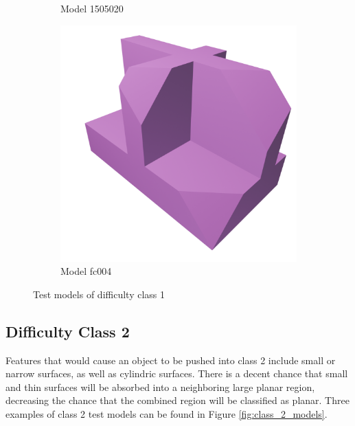 \begin{figure}[htb]
\begin{subfigure}{0.3\textwidth}
	\caption{Model 1505020}
\end{subfigure}
\hfill
\begin{subfigure}{0.3\textwidth}
	\includegraphics[width=\textwidth]{../resources/models/fc004.png}
	\caption{Model fc004}
\end{subfigure}
\caption{Test models of difficulty class 1}
\label{fig:class_1_models}
\end{figure}

\subsection{Difficulty Class 2}
Features that would cause an object to be pushed into class 2 include small or narrow surfaces, as well as cylindric surfaces.
There is a decent chance that small and thin surfaces will be absorbed into a neighboring large planar region, decreasing the chance that the combined region will be classified as planar.
Three examples of class 2 test models can be found in Figure \ref{fig:class_2_models}.

